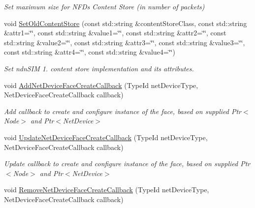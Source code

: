 \begin{DoxyCompactItemize}
\begin{DoxyCompactList}\small\item\em Set maximum size for N\+FD\textquotesingle{}s Content Store (in number of packets) \end{DoxyCompactList}\item 
void \hyperlink{classns3_1_1ndn_1_1StackHelper_a05ce8355a36d8b70e7a5c8fae86a95c8}{Set\+Old\+Content\+Store} (const std\+::string \&content\+Store\+Class, const std\+::string \&attr1=\char`\"{}\char`\"{}, const std\+::string \&value1=\char`\"{}\char`\"{}, const std\+::string \&attr2=\char`\"{}\char`\"{}, const std\+::string \&value2=\char`\"{}\char`\"{}, const std\+::string \&attr3=\char`\"{}\char`\"{}, const std\+::string \&value3=\char`\"{}\char`\"{}, const std\+::string \&attr4=\char`\"{}\char`\"{}, const std\+::string \&value4=\char`\"{}\char`\"{})
\begin{DoxyCompactList}\small\item\em Set ndn\+S\+IM 1. content store implementation and its attributes. \end{DoxyCompactList}\item 
void \hyperlink{classns3_1_1ndn_1_1StackHelper_a88e5d40e39bb56bfd3798c63b15e5cdf}{Add\+Net\+Device\+Face\+Create\+Callback} (Type\+Id net\+Device\+Type, Net\+Device\+Face\+Create\+Callback callback)
\begin{DoxyCompactList}\small\item\em Add callback to create and configure instance of the face, based on supplied Ptr$<$\+Node$>$ and Ptr$<$\+Net\+Device$>$ \end{DoxyCompactList}\item 
void \hyperlink{classns3_1_1ndn_1_1StackHelper_a55fc628833a71bf783dd0dcae887f1f3}{Update\+Net\+Device\+Face\+Create\+Callback} (Type\+Id net\+Device\+Type, Net\+Device\+Face\+Create\+Callback callback)
\begin{DoxyCompactList}\small\item\em Update callback to create and configure instance of the face, based on supplied Ptr$<$\+Node$>$ and Ptr$<$\+Net\+Device$>$ \end{DoxyCompactList}\item 
void \hyperlink{classns3_1_1ndn_1_1StackHelper_a2f99b477ca1bc36495a61528849538ca}{Remove\+Net\+Device\+Face\+Create\+Callback} (Type\+Id net\+Device\+Type, Net\+Device\+Face\+Create\+Callback callback)\hypertarget{classns3_1_1ndn_1_1StackHelper_a2f99b477ca1bc36495a61528849538ca}{}\label{classns3_1_1ndn_1_1StackHelper_a2f99b477ca1bc36495a61528849538ca}


\end{DoxyCompactItemize}
